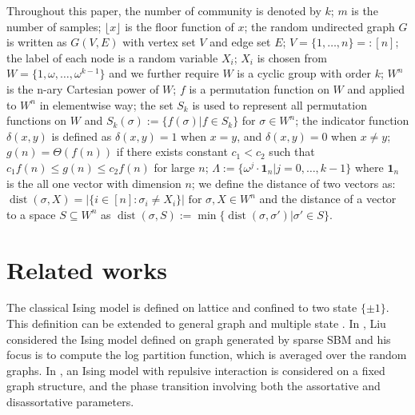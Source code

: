 \documentclass[journal]{IEEEtran}
\DeclareMathOperator{\dist}{dist}
\begin{document}
Throughout this paper, the number of community is denoted by $k$; $m$ is the number of samples; $\lfloor x \rfloor$ is the floor function of $x$; the random undirected graph $G$ is written as $G(V,E)$ with vertex set $V$ and edge set $E$;
$V=\{1,\dots, n\} =: [n]$;
the label of each node is a random variable $X_i$; $X_i$ is chosen from $W= \{1, \omega, \dots, \omega^{k-1}\}$ and we further require $W$
is a cyclic group with order $k$; $W^n$ is the n-ary Cartesian power of $W$;
$f$ is a permutation function on $W$ and applied to $W^n$ in elementwise way;
the set $S_k$ is used to represent all permutation functions on $W$ and $S_k(\sigma):=\{f(\sigma)| f\in S_k\}$ for $\sigma \in W^n$;
the indicator function $\delta(x,y)$ is defined as
$\delta(x,y) = 1 $ when $x=y$, and $\delta(x,y)=0$ when $x\neq y$;
$g(n) = \Theta(f(n))$ if there exists constant $c_1 < c_2$ such that $c_1 f(n) \leq g(n) \leq c_2 f(n)$
for large $n$;
$\Lambda := \{ \omega^j  \cdot \mathbf{1}_n | j=0, \dots,k-1\}$
where $\mathbf{1}_n$ is the all one vector with dimension $n$;
we define the distance of two vectors as:
$\dist(\sigma, X)
=|\{i\in[n]:\sigma_i\neq X_i\}| \textrm{ for } \sigma,X\in W^n
$ and the distance of a vector to a space $S\subseteq W^n$
as
$\dist(\sigma,S)
:=\min\{\dist(\sigma, \sigma') | \sigma' \in S\}
$.
\section{Related works}
The classical Ising model is defined on lattice and confined to two state $\{\pm 1\}$. This definition
can be extended to general graph and multiple state \cite{potts1952some}. In \cite{liu2017log}, Liu considered
the Ising model defined on graph generated by sparse SBM and his focus is to compute the log partition function,
which is averaged over the random graphs. In \cite{berthet2019exact}, an Ising model with repulsive interaction
is considered on a fixed graph structure, and the phase transition involving both the assortative and disassortative
parameters.
\end{document}

